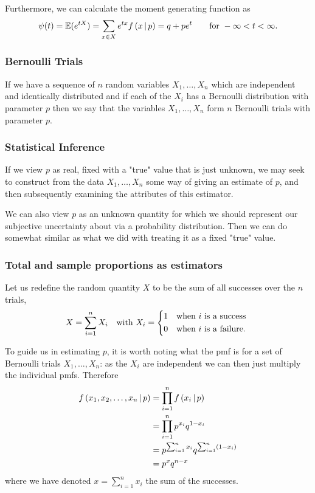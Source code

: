\documentclass[10pt, a4paper]{article}
\begin{document}
Furthermore,
we can calculate the moment generating function as
\[
\psi(t) = \mathbb{E}(e ^ {tX}) = \sum_{x \in X}e ^ {tx}f\left(x \,\middle|\, p\right) = q + pe ^ t\qquad\text{for } -\infty < t < \infty.
\]

\subsubsection{Bernoulli Trials}
If we have a sequence of $n$ random variables $X_1, \dotsc, X_n$ which are independent and identically distributed and if each of the $X_i$ has a Bernoulli distribution with parameter $p$ then we say that the variables $X_1, \dotsc, X_n$ form $n$ Bernoulli trials with parameter $p$.

\subsubsection{Statistical Inference}
If we view $p$ as real,
fixed with a "true" value that is just unknown,
we may seek to construct from the data $X_1, \dotsc, X_n$ some way of giving an estimate of $p$,
and then subsequently examining the attributes of this estimator.

We can also view $p$ as an unknown quantity for which we should represent our subjective uncertainty about via a probability distribution.
Then we can do somewhat similar as what we did with treating it as a fixed "true" value.

\subsubsection{Total and sample proportions as estimators}
Let us redefine the random quantity $X$ to be the sum of all successes over the $n$ trials,
\begin{align*}
    X = \sum_{i = 1}^{n}X_i&&\text{with } X_i = \begin{dcases*}
        1 & when $i$ is a success \\
        0 & when $i$ is a failure.
    \end{dcases*}
\end{align*}

To guide us in estimating $p$,
it is worth noting what the pmf is for a set of Bernoulli trials $X_1, \dotsc, X_n$:
as the $X_i$ are independent we can then just multiply the individual pmfs.
Therefore
\begin{align*}
    f\left(x_1, x_2, \dotsc, x_n \,\middle|\, p\right) &= \prod_{i = 1}^{n}f\left(x_i \,\middle|\, p\right) \\
    &= \prod_{i = 1}^{n}p ^ {x_i}q ^ {1 - x_i} \\
    &= p ^ {\sum_{i = 1}^{n}x_i}q ^ {\sum_{i = 1}^{n}(1 - x_i)} \\
    &= p ^ xq ^ {n - x}
\end{align*}
where we have denoted $x = \sum_{i = 1}^{n}x_i$ the sum of the successes.
\end{document}
